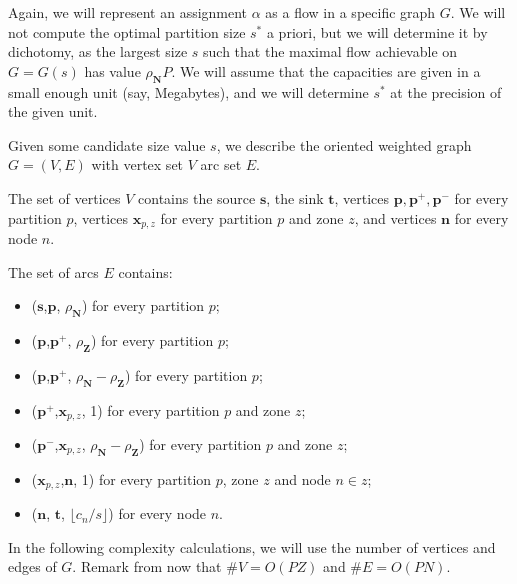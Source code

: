 \documentclass[]{article}
\begin{document}
Again, we will represent an assignment $\alpha$ as a flow in a specific graph $G$. We will not compute the optimal partition size $s^*$ a priori, but we will determine it by dichotomy, as the largest size $s$ such that the maximal flow achievable on $G=G(s)$ has value $\rho_\mathbf{N}P$. We will assume that the capacities are given in a small enough unit (say, Megabytes), and we will determine $s^*$ at the precision of the given unit.

Given some candidate size value $s$, we describe the oriented weighted graph $G=(V,E)$ with vertex set $V$ arc set $E$.

The set of vertices $V$ contains the source $\mathbf{s}$, the sink $\mathbf{t}$, vertices 
$\mathbf{p, p^+, p^-}$ for every partition $p$, vertices $\mathbf{x}_{p,z}$ for every partition $p$ and zone $z$, and vertices $\mathbf{n}$ for every node $n$. 

The set of arcs $E$ contains:
\begin{itemize}
	\item ($\mathbf{s}$,$\mathbf{p}$, $\rho_\mathbf{N}$) for every partition $p$;
	\item ($\mathbf{p}$,$\mathbf{p}^+$, $\rho_\mathbf{Z}$) for every partition $p$;
	\item ($\mathbf{p}$,$\mathbf{p}^+$, $\rho_\mathbf{N}-\rho_\mathbf{Z}$) for every partition $p$;
	\item ($\mathbf{p}^+$,$\mathbf{x}_{p,z}$, 1) for every partition $p$ and zone $z$;
	\item ($\mathbf{p}^-$,$\mathbf{x}_{p,z}$, $\rho_\mathbf{N}-\rho_\mathbf{Z}$) for every partition $p$ and zone $z$;
	\item ($\mathbf{x}_{p,z}$,$\mathbf{n}$, 1) for every partition $p$, zone $z$ and node $n\in z$;
	\item ($\mathbf{n}$, $\mathbf{t}$, $\lfloor c_n/s \rfloor$) for every node $n$.
\end{itemize}

In the following complexity calculations, we will use the number of vertices and edges of $G$. Remark from now that $\# V = O(PZ)$ and $\# E = O(PN)$.
\end{document}
